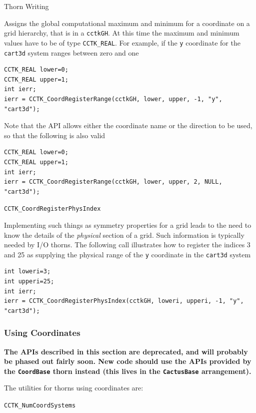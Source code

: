 \begin{cactuspart}{Thorn Writing}
\begin{Lentry}
Assigns the global computational maximum and minimum for a coordinate
on a grid hierarchy, that is in a \texttt{cctkGH}. At this time the
maximum and minimum values have to be of type \texttt{CCTK\_REAL}. For
example, if the \texttt{y} coordinate for the \texttt{cart3d} system ranges
between zero and one
%
\begin{verbatim}
CCTK_REAL lower=0;
CCTK_REAL upper=1;
int ierr;
ierr = CCTK_CoordRegisterRange(cctkGH, lower, upper, -1, "y", "cart3d");
\end{verbatim}
%
Note that the API allows either the coordinate name or the direction to
be used, so that the following is also valid
%
\begin{verbatim}
CCTK_REAL lower=0;
CCTK_REAL upper=1;
int ierr;
ierr = CCTK_CoordRegisterRange(cctkGH, lower, upper, 2, NULL, "cart3d");
\end{verbatim}

\item[\texttt{CCTK\_CoordRegisterPhysIndex}]

Implementing such things as symmetry properties for a grid leads to
the need to know the details of the \emph{physical} section of a grid.
Such information is typically needed by I/O thorns. The following call
illustrates how to register the
indices 3 and 25 as supplying the physical range of the \texttt{y}
coordinate in the \texttt{cart3d} system
%
\begin{verbatim}
int loweri=3;
int upperi=25;
int ierr;
ierr = CCTK_CoordRegisterPhysIndex(cctkGH, loweri, upperi, -1, "y", "cart3d");
\end{verbatim}



\end{Lentry}

\subsubsection{Using Coordinates}

\textbf{The APIs described in this section are deprecated, and will
probably be phased out fairly soon.
New code should use the APIs provided by the \texttt{CoordBase} thorn
instead (this lives in the \texttt{CactusBase} arrangement).}

The utilities for thorns using coordinates are:

\begin{Lentry}

\item[\texttt{CCTK\_NumCoordSystems}]


\end{Lentry}
\end{cactuspart}
